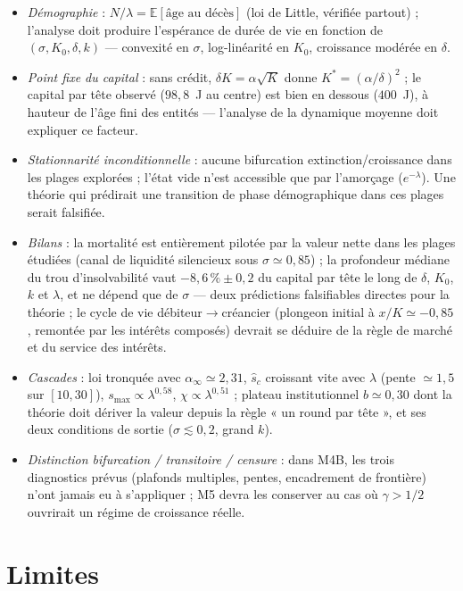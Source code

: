 \documentclass[11pt,a4paper]{article}
\newcommand{\E}{\mathbb{E}}
\begin{document}
\begin{itemize}
\item \emph{Démographie} : $N/\lambda=\E[\text{âge au décès}]$ (loi de
  Little, vérifiée partout) ; l'analyse doit produire l'espérance de
  durée de vie en fonction de $(\sigma,K_0,\delta,k)$ — convexité en
  $\sigma$, log-linéarité en $K_0$, croissance modérée en $\delta$.
\item \emph{Point fixe du capital} : sans crédit,
  $\delta K=\alpha\sqrt K$ donne $K^\ast=(\alpha/\delta)^2$ ; le
  capital par tête observé ($98{,}8$~J au centre) est bien en dessous
  ($400$~J), à hauteur de l'âge fini des entités — l'analyse de la
  dynamique moyenne doit expliquer ce facteur.
\item \emph{Stationnarité inconditionnelle} : aucune bifurcation
  extinction/croissance dans les plages explorées ; l'état vide n'est
  accessible que par l'amorçage ($e^{-\lambda}$). Une théorie qui
  prédirait une transition de phase démographique dans ces plages
  serait falsifiée.
\item \emph{Bilans} : la mortalité est entièrement pilotée par la
  valeur nette dans les plages étudiées (canal de liquidité silencieux
  sous $\sigma\simeq0{,}85$) ; la profondeur médiane du trou
  d'insolvabilité vaut $-8{,}6\,\%\pm0{,}2$ du capital par tête le long
  de $\delta$, $K_0$, $k$ et $\lambda$, et ne dépend que de $\sigma$ —
  deux prédictions falsifiables directes pour la théorie ; le cycle de
  vie débiteur$\to$créancier (plongeon initial à $x/K\simeq-0{,}85$,
  remontée par les intérêts composés) devrait se déduire de la règle de
  marché et du service des intérêts.
\item \emph{Cascades} : loi tronquée avec
  $\alpha_\infty\simeq2{,}31$, $\hat s_c$ croissant vite avec
  $\lambda$ (pente $\simeq1{,}5$ sur $[10,30]$),
  $s_{\max}\propto\lambda^{0{,}58}$,
  $\chi\propto\lambda^{0{,}51}$ ; plateau institutionnel
  $b\simeq0{,}30$ dont la théorie doit dériver la valeur depuis la
  règle « un round par tête », et ses deux conditions de sortie
  ($\sigma\lesssim0{,}2$, grand $k$).
\item \emph{Distinction bifurcation / transitoire / censure} : dans
  M4B, les trois diagnostics prévus (plafonds multiples, pentes,
  encadrement de frontière) n'ont jamais eu à s'appliquer ; M5 devra
  les conserver au cas où $\gamma>1/2$ ouvrirait un régime de
  croissance réelle.
\end{itemize}

\section{Limites}
\label{sec:limites}
\end{document}

